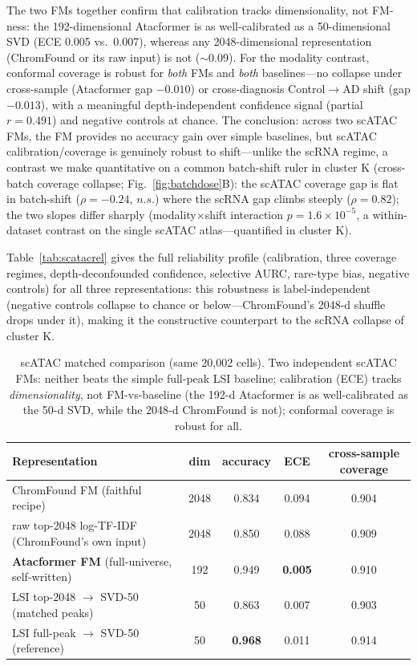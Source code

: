 \documentclass[11pt]{article}
\begin{document}
The two FMs together confirm that calibration tracks dimensionality, not FM-ness: the 192-dimensional Atacformer is as well-calibrated as a 50-dimensional SVD (ECE 0.005 vs.\ 0.007), whereas any 2048-dimensional representation (ChromFound or its raw input) is not ($\sim$0.09). For the modality contrast, conformal coverage is robust for \emph{both} FMs and \emph{both} baselines---no collapse under cross-sample (Atacformer gap $-0.010$) or cross-diagnosis Control$\to$AD shift (gap $-0.013$), with a meaningful depth-independent confidence signal (partial $r=0.491$) and negative controls at chance. The conclusion: across two scATAC FMs, the FM provides no accuracy gain over simple baselines, but scATAC calibration/coverage is genuinely robust to shift---unlike the scRNA regime, a contrast we make quantitative on a common batch-shift ruler in cluster K (cross-batch coverage collapse; Fig.~\ref{fig:batchdose}B): the scATAC coverage gap is flat in batch-shift ($\rho=-0.24$, $n.s.$) where the scRNA gap climbs steeply ($\rho=0.82$); the two slopes differ sharply (modality$\times$shift interaction $p=1.6\times10^{-5}$, a within-dataset contrast on the single scATAC atlas---quantified in cluster K).

Table~\ref{tab:scatacrel} gives the full reliability profile (calibration, three coverage regimes, depth-deconfounded confidence, selective AURC, rare-type bias, negative controls) for all three representations: this robustness is label-independent (negative controls collapse to chance or below---ChromFound's 2048-d shuffle drops under it), making it the constructive counterpart to the scRNA collapse of cluster K.

\begin{table}[!ht]\centering\footnotesize
\caption{scATAC matched comparison (same 20{,}002 cells). Two independent scATAC FMs: neither beats the simple full-peak LSI baseline; calibration (ECE) tracks \emph{dimensionality}, not FM-vs-baseline (the 192-d Atacformer is as well-calibrated as the 50-d SVD, while the 2048-d ChromFound is not); conformal coverage is robust for all.}
\label{tab:fm}
\begin{tabular}{@{}lcccc@{}}
\toprule
Representation & dim & accuracy & ECE & cross-sample coverage \\
\midrule
ChromFound FM (faithful recipe) & 2048 & 0.834 & 0.094 & 0.904 \\
raw top-2048 log-TF-IDF (ChromFound's own input) & 2048 & 0.850 & 0.088 & 0.909 \\
\textbf{Atacformer FM} (full-universe, self-written) & 192 & 0.949 & \textbf{0.005} & 0.910 \\
LSI top-2048 $\to$ SVD-50 (matched peaks) & 50 & 0.863 & 0.007 & 0.903 \\
LSI full-peak $\to$ SVD-50 (reference) & 50 & \textbf{0.968} & 0.011 & 0.914 \\
\bottomrule
\end{tabular}
\end{table}
\end{document}
